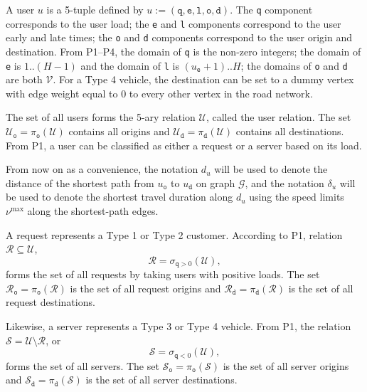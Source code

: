 A user $u$ is a 5-tuple defined by
${u:=(\texttt{q},\texttt{e},\texttt{l},\texttt{o},\texttt{d})}$.  The
\texttt{q} component corresponds to the user load; the \texttt{e} and
\texttt{l} components correspond to the user early and late times; the
\texttt{o} and \texttt{d} components correspond to the user origin and
destination.
From P1--P4, the domain of \texttt{q} is the non-zero integers; the domain of \texttt{e} is
$1..(H-1)$ and the domain of \texttt{l} is $(u_\texttt{e}+1)..H$; the domains
of \texttt{o} and \texttt{d} are both $\mathcal{V}$.
For a Type 4 vehicle, the destination can be set to a dummy vertex with edge
weight equal to 0 to every other vertex in the road network.

The set of all users forms the 5-ary relation $\mathcal{U}$, called
the user relation.
The set
$\mathcal{U}_\texttt{o}=\pi_\texttt{o}(\mathcal{U})$ contains all origins and
$\mathcal{U}_\texttt{d}=\pi_\texttt{d}(\mathcal{U})$ contains all destinations.
From P1, a user can be classified as either a request or a server based on its load.

From now on as a convenience, the notation $d_u$ will be used to denote the distance of the
shortest path from $u_\texttt{o}$ to $u_\texttt{d}$ on graph $\mathcal{G}$, and
the notation $\delta_u$ will be used to denote the shortest travel duration
along $d_u$ using the speed limits $\nu^\textrm{max}$ along the shortest-path edges.

A request represents a Type 1 or Type 2 customer.
According to P1,
relation $\mathcal{R}\subseteq\mathcal{U}$,
$$\mathcal{R}=\sigma_{\texttt{q}>0}(\mathcal{U}),$$
forms the set of all requests by taking users with positive loads. The set
$\mathcal{R}_\texttt{o}=\pi_\texttt{o}(\mathcal{R})$ is the set of all request origins and
$\mathcal{R}_\texttt{d}=\pi_\texttt{d}(\mathcal{R})$ is the set of all request destinations.

Likewise, a server represents a Type 3 or Type 4 vehicle.
From P1, the relation $\mathcal{S}=\mathcal{U}\setminus\mathcal{R}$, or
$$\mathcal{S}=\sigma_{\texttt{q}<0}(\mathcal{U}),$$
forms the set of all servers. The set
$\mathcal{S}_\texttt{o}=\pi_\texttt{o}(\mathcal{S})$ is the set of all server origins and
$\mathcal{S}_\texttt{d}=\pi_\texttt{d}(\mathcal{S})$ is the set of all server destinations.

